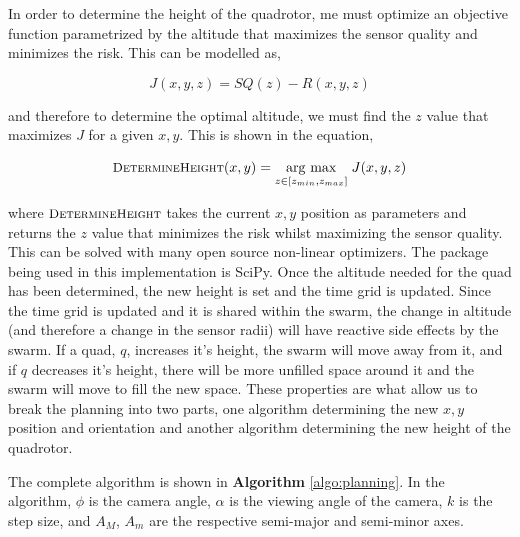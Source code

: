 \documentclass[12pt]{article}
\newcommand{\Function}[1]{\ensuremath{{\small \textsc{#1}}}}
\newcommand{\argmax}[1]{\underset{#1}{\operatorname{arg}\,\operatorname{max}}\;}
\begin{document}
In order to determine the height of the quadrotor, me must optimize an
objective function parametrized by the altitude that maximizes the sensor
quality and minimizes the risk. This can be modelled as,

$$ J(x, y, z) = SQ(z) - R(x, y, z) $$

and therefore to determine the optimal altitude, we must find the $z$ value
that maximizes $J$ for a given $x, y$. This is shown in the equation,

$$ \Function{DetermineHeight}(x, y) = \argmax{z \in [z_{min}, z_{max}]} J(x, y,
z) $$

where $\Function{DetermineHeight}$ takes the current $x, y$ position as
parameters and returns the $z$ value that minimizes the risk whilst maximizing
the sensor quality.  This can be solved with many open source non-linear
optimizers.  The package being used in this implementation is SciPy.  Once the
altitude needed for the quad has been determined, the new height is set and the
time grid is updated.  Since the time grid is updated and it is shared within
the swarm, the change in altitude (and therefore a change in the sensor radii)
will have reactive side effects by the swarm.  If a quad, $q$, increases it's
height, the swarm will move away from it, and if $q$ decreases it's height,
there will be more unfilled space around it and the swarm will move to fill the
new space.  These properties are what allow us to break the planning into two
parts, one algorithm determining the new $x, y$ position and orientation and
another algorithm determining the new height of the quadrotor.

The complete algorithm is shown in \textbf{Algorithm} \ref{algo:planning}. In
the algorithm, $\phi$ is the camera angle, $\alpha$ is the viewing angle of the
camera, $k$ is the step size, and $A_{M}$, $A_{m}$ are the respective
semi-major and semi-minor axes.
\end{document}
